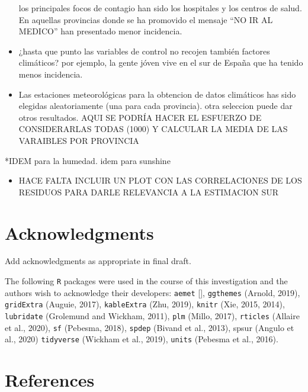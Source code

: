 \documentclass[]{elsarticle} %
\providecommand{\tightlist}{%
  \setlength{\itemsep}{0pt}\setlength{\parskip}{0pt}}
\begin{document}
\begin{itemize}
  los principales focos de contagio han sido los hospitales y los
  centros de salud. En aquellas provincias donde se ha promovido el
  mensaje ``NO IR AL MEDICO'' han presentado menor incidencia.
\item
  ¿hasta que punto las variables de control no recojen también factores
  climáticos? por ejemplo, la gente jóven vive en el sur de España que
  ha tenido menos incidencia.
\item
  Las estaciones meteorológicas para la obtencion de datos climáticos
  has sido elegidas aleatoriamente (una para cada provincia). otra
  seleccion puede dar otros resultados. AQUI SE PODRÍA HACER EL ESFUERZO
  DE CONSIDERARLAS TODAS (1000) Y CALCULAR LA MEDIA DE LAS VARAIBLES POR
  PROVINCIA
\end{itemize}

*IDEM para la humedad. idem para sunshine

\begin{itemize}
\tightlist
\item
  HACE FALTA INCLUIR UN PLOT CON LAS CORRELACIONES DE LOS RESIDUOS PARA
  DARLE RELEVANCIA A LA ESTIMACION SUR
\end{itemize}

\hypertarget{acknowledgments}{%
\section*{Acknowledgments}\label{acknowledgments}}

Add acknowledgments as appropriate in final draft.

The following \texttt{R} packages were used in the course of this
investigation and the authors wish to acknowledge their developers:
\texttt{aemet} {[}{]}, \texttt{ggthemes} (Arnold, 2019),
\texttt{gridExtra} (Auguie, 2017), \texttt{kableExtra} (Zhu, 2019),
\texttt{knitr} (Xie, 2015, 2014), \texttt{lubridate} (Grolemund and
Wickham, 2011), \texttt{plm} (Millo, 2017), \texttt{rticles} (Allaire et
al., 2020), \texttt{sf} (Pebesma, 2018), \texttt{spdep} (Bivand et al.,
2013), spsur (Angulo et al., 2020) \texttt{tidyverse} (Wickham et al.,
2019), \texttt{units} (Pebesma et al., 2016).

\hypertarget{references}{%
\section*{References}\label{references}}
\end{document}
